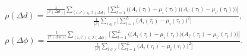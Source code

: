 \documentclass[12pt, draftcls, onecolumn]{IEEEtran}
\begin{document}
{\begin{align}\label{SC}
    &\rho(\Delta d) = \frac{\frac{1}{|\mathcal{I}(\Delta d)|}\sum_{(i,i') \in \mathcal{I}(\Delta d)}\Bigg[\sum_{l = 1}^{L}\bigg(\Big(A_{i}(\tau_{l}) - \mu_{i}(\tau_{l})\Big)\Big(A_{i'}(\tau_{l}) - \mu_{i'}(\tau_{l})\Big)\bigg)\Bigg]}{\frac{1}{|\mathcal{I}|}\sum_{i \in \mathcal{I}}\bigg[\sum_{l = 1}^{L}\Big(A_{i}(\tau_{l}) - \mu_{i}(\tau_{l})\Big)^{2}\bigg]},\\
    &\rho(\Delta \phi) = \frac{\frac{1}{|\mathcal{I}(\Delta \phi)|}\sum_{(i,i') \in \mathcal{I}(\Delta \phi)}\Bigg[\sum_{l = 1}^{L}\bigg(\Big(A_{i}(\tau_{l}) - \mu_{i}(\tau_{l})\Big)\Big(A_{i'}(\tau_{l}) - \mu_{i'}(\tau_{l})\Big)\bigg)\Bigg]}{\frac{1}{|\mathcal{I}|}\sum_{i \in \mathcal{I}}\bigg[\sum_{l = 1}^{L}\Big(A_{i}(\tau_{l}) - \mu_{i}(\tau_{l})\Big)^{2}\bigg]}.
\end{align}

}
\end{document}
